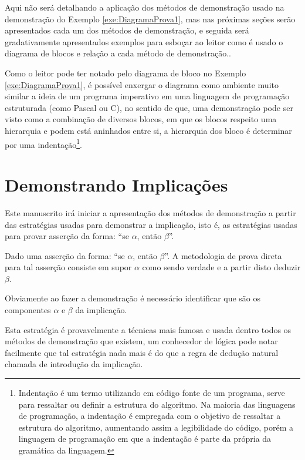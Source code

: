 Aqui não será detalhando a aplicação dos métodos de demonstração usado na demonstração do Exemplo \ref{exe:DiagramaProva1}, mas nas próximas seções serão apresentados cada um dos métodos de demonstração, e seguida será gradativamente apresentados exemplos para esboçar ao leitor como é usado o diagrama de blocos e relação a cada método de demonstração..

Como o leitor pode ter notado pelo diagrama de bloco no Exemplo \ref{exe:DiagramaProva1}, é possível enxergar o diagrama como ambiente muito similar a ideia de um programa imperativo em uma linguagem de programação estruturada (como Pascal ou C), no sentido de que, uma demonstração pode ser visto como a combinação de diversos blocos, em que os blocos respeito uma hierarquia e podem está aninhados entre si, a hierarquia dos bloco é determinar por uma indentação\footnote{Indentação é um termo utilizando em código fonte de um programa, serve para ressaltar ou definir a estrutura do algoritmo. Na maioria das linguagens de programação, a indentação é empregada com o objetivo de ressaltar a estrutura do algoritmo, aumentando assim a legibilidade do código, porém a linguagem de programação em que a indentação é parte da própria da gramática da linguagem.}. 

\section{Demonstrando Implicações}\label{sec:DemonstrandoImplicacoes}

Este manuscrito irá iniciar a apresentação dos métodos de demonstração a partir das estratégias usadas para demonstrar a implicação, isto é, as estratégias usadas para provar asserção da forma: ``se $\alpha$, então $\beta$''.

\begin{definition}
	Dado uma asserção da forma: ``se $\alpha$, então $\beta$''. A metodologia de prova direta para tal asserção consiste em supor $\alpha$ como sendo verdade e a partir disto deduzir $\beta$.
\end{definition}

\begin{remark}
	Obviamente ao fazer a demonstração é necessário identificar que são os componentes $\alpha$ e $\beta$ da implicação.
\end{remark}

Esta estratégia é provavelmente a técnicas mais famosa e usada dentro todos os métodos de demonstração que existem, um conhecedor de lógica pode notar facilmente que tal estratégia nada mais é do que a regra de dedução natural chamada de introdução da implicação\cite{joaoPavao2014}. 

